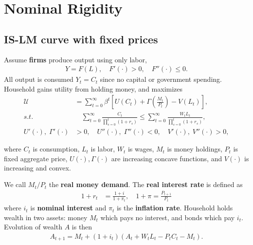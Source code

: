 \documentclass[../main.tex]{subfiles}
\begin{document}
\chapter{Nominal Rigidity}
    
    \section{IS-LM curve with fixed prices}
    
        Assume \textbf{firms} produce output using only labor,
        \begin{align}
            Y = F(L), \quad F'(\cdot) > 0, \quad F''(\cdot) \le 0.
        \end{align}
        All output is consumed $Y_t = C_t$ since no capital or government spending. Household gains utility from holding money, and maximizes
        \begin{align}
            \mathcal{U} &= \sum_{t=0}^\infty \beta^t
            \left[
                U(C_t) + \Gamma\left(\frac{M_t}{P_t}\right) - V(L_t)
            \right],
            \label{eqn:nom-rig-utility}
            \\
            s.t. & \quad \sum_{t=0}^\infty \frac{C_t}{\prod_{s=0}^{t}(1+r_s)}
            \le \sum_{t=0}^\infty \frac{W_t L_t}{\prod_{s=0}^{t}(1+r_s)},
            \\
            U'(\cdot),\; \Gamma'(\cdot)
            &> 0,
            \quad
            U''(\cdot),\; \Gamma''(\cdot)
            < 0,
            \quad
            V'(\cdot),\; V''(\cdot) > 0,
        \end{align}
        
        where $C_t$ is consumption, $L_t$ is labor, $W_t$ is wages, $M_t$ is money holdings, $P_t$ is fixed aggregate price, $U(\cdot), \Gamma(\cdot)$ are increasing concave functions, and $V(\cdot)$ is increasing and convex.
        
        We call $M_t / P_t$ the \textbf{real money demand}. The \textbf{real interest rate} is defined as
        \begin{align}
            1 + r_t &= \frac{1+i}{1+\pi_t},
            \quad
            1 + \pi = \frac{P_{t+1}}{P_t}
        \end{align}
        where $i_t$ is \textbf{nominal interest} and $\pi_t$ is the \textbf{inflation rate}. Household holds wealth in two assets: money $M_t$ which pays no interest, and bonds which pay $i_t$. Evolution of wealth $A$ is then
        \begin{align}
            A_{t+1} = M_t + (1+i_t)(A_t + W_t L_t - P_t C_t - M_t).
            \label{eqn:wealth-evo}
        \end{align}
        
\end{document}
